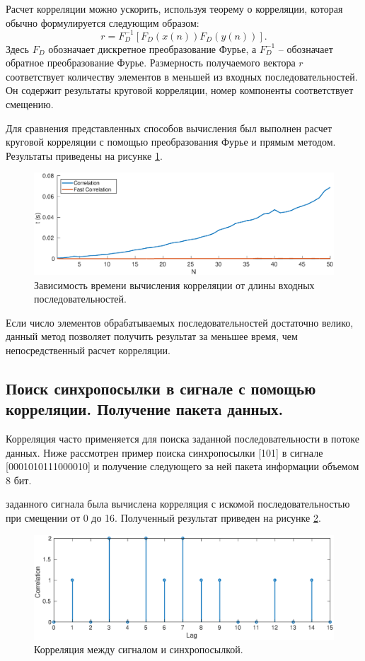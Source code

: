\documentclass[a4paper,14pt]{extarticle}
\begin{document}
Расчет корреляции можно ускорить, используя теорему о корреляции, которая обычно формулируется следующим образом:
\begin{equation*}
r = F_D^{-1} [F_D(x(n))F_D(y(n))].
\end{equation*} 
Здесь $F_D$ обозначает дискретное преобразование Фурье, а $F_D^{-1}$ -- обозначает обратное преобразование Фурье. Размерность получаемого вектора $r$ соответствует количеству элементов в меньшей из входных последовательностей. Он содержит результаты круговой корреляции, номер компоненты соответствует смещению.


Для сравнения представленных способов вычисления был выполнен расчет круговой корреляции с помощью преобразования Фурье и прямым методом. Результаты приведены на рисунке \ref{tm}.
\begin{figure}[H]
\includegraphics[width=1\textwidth]{time_measure.eps}
\captionsetup{justification=centering,margin=1cm}
\caption{Зависимость времени вычисления корреляции от длины входных последовательностей.}
\label{tm}
\end{figure}
Если число элементов обрабатываемых последовательностей достаточно велико, данный метод позволяет получить результат за меньшее время, чем непосредственный расчет корреляции.

\subsection{Поиск синхропосылки в сигнале с помощью корреляции. Получение пакета данных.}

Корреляция часто применяется для поиска заданной последовательности в потоке данных. Ниже рассмотрен пример поиска синхропосылки 
[101] в сигнале [0001010111000010] и получение следующего за ней пакета информации объемом 8 бит.

заданного сигнала была вычислена корреляция с искомой последовательностью при смещении от 0 до 16. Полученный результат приведен на рисунке \ref{corr}.

\begin{figure}[H]
\includegraphics[width=1\textwidth]{corr.eps}
\captionsetup{justification=centering,margin=1cm}
\caption{Корреляция между сигналом и синхропосылкой.}
\label{corr}
\end{figure}
\end{document}
